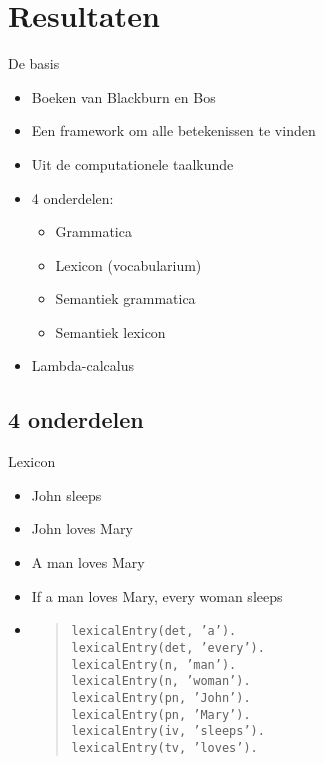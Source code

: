 \documentclass[notes, dvipsnames]{beamer}
\newcommand{\seperation}{
	\vspace{1em}
	\ppause
}
\newcommand{\hitem}{
	\ppause
	\item
}
\newcommand{\ppause}{\onslide<+>}
\begin{document}
  \section{Resultaten}
	\begin{frame}{De basis}
		\begin{itemize}
			\hitem Boeken van Blackburn en Bos \cite{BlackburnBosBook1, BlackburnBosBook2} 
      \item Een framework om alle betekenissen te vinden
      \item Uit de computationele taalkunde
			
			\seperation
      \item 4 onderdelen:
        \begin{itemize}
          \item Grammatica
          \item Lexicon (vocabularium)
          \item Semantiek grammatica
          \item Semantiek lexicon
        \end{itemize}
      \item Lambda-calcalus
		\end{itemize}
	\end{frame}

  \subsection{4 onderdelen}
	\begin{frame}{Lexicon}
		\begin{itemize}
      \hitem John sleeps
			\item John loves Mary
      \item A man loves Mary
      \item If a man loves Mary, every woman sleeps
      \hitem
        \begin{quote}
          \texttt{lexicalEntry(det, 'a').} \\
          \texttt{lexicalEntry(det, 'every').} \\
          \texttt{lexicalEntry(n, 'man').} \\
          \texttt{lexicalEntry(n, 'woman').} \\
          \texttt{lexicalEntry(pn, 'John').} \\
          \texttt{lexicalEntry(pn, 'Mary').} \\
          \texttt{lexicalEntry(iv, 'sleeps').} \\
          \texttt{lexicalEntry(tv, 'loves').} \\
        \end{quote}
		\end{itemize}
	\end{frame}
\end{document}
